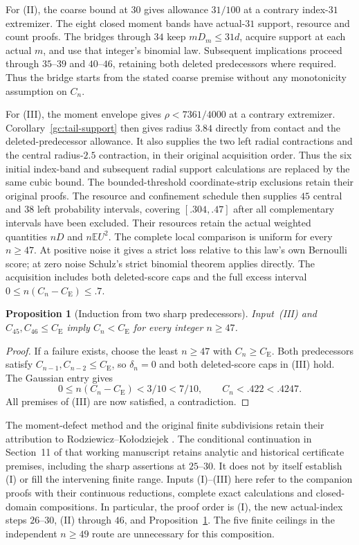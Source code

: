 \documentclass[aop,preprint]{imsart}
\newtheorem{proposition}[theorem]{Proposition}
\theoremstyle{definition}
\newcommand{\CE}{C_{\mathrm E}}
\newcommand{\E}{\mathbb E}
\numberwithin{equation}{section}
\begin{document}
For (II), the coarse bound at $30$ gives allowance $31/100$ at
a contrary index-$31$ extremizer. The eight closed moment bands have
actual-$31$ support, resource and count proofs. The bridges through
$34$ keep $mD_m\le31d$, acquire support at each actual $m$, and use
that integer's binomial law. Subsequent implications proceed through
$35$--$39$ and $40$--$46$, retaining both deleted predecessors where
required. Thus the bridge starts from the stated coarse premise
without any monotonicity assumption on $C_n$.


For (III), the moment envelope gives $\rho<7361/4000$ at a contrary
extremizer. Corollary~\ref{gc:tail-support} then gives radius $3.84$
directly from contact and the deleted-predecessor allowance.
It also supplies the two left radial contractions and the central
radius-$2.5$ contraction, in their original acquisition order.
Thus the six initial index-band and subsequent radial support
calculations are replaced by the same cubic bound. The bounded-threshold
coordinate-strip exclusions retain their original proofs.
The resource and confinement schedule then supplies $45$ central
and $38$ left probability intervals, covering $[.304,.47]$ after
all complementary intervals have been excluded. Their resources
retain the actual weighted quantities $nD$ and $n\E U^2$.
The complete local comparison is uniform for every $n\ge47$.
At positive noise it gives a strict loss relative to this law's
own Bernoulli score; at zero noise Schulz's strict binomial theorem
applies directly. The acquisition includes both deleted-score caps
and the full excess interval $0\le n(C_n-\CE)\le.7$.

\begin{proposition}[Induction from two sharp predecessors]\label{gi:tail}
Input~(III) and $C_{45},C_{46}\le\CE$ imply
$C_n<\CE$ for every integer $n\ge47$.
\end{proposition}
\begin{proof}
If a failure exists, choose the least $n\ge47$ with $C_n\ge\CE$.
Both predecessors satisfy $C_{n-1},C_{n-2}\le\CE$, so $\delta_n=0$
and both deleted-score caps in (III) hold. The Gaussian entry gives
\[
 0\le n(C_n-\CE)<3/10<7/10,\qquad
 C_n<.422<.4247.
\]
All premises of (III) are now satisfied, a contradiction.
\end{proof}

The moment-defect method and the original finite subdivisions retain
their attribution to Rodziewicz--Ko\l{}odziejek \cite{RK2026}.
The conditional continuation in Section~11 of that working manuscript
retains analytic and historical certificate premises, including the
sharp assertions at $25$--$30$. It does not by itself establish (I) or
fill the intervening finite range. Inputs (I)--(III) here refer to the
companion proofs with their continuous reductions, complete exact
calculations and closed-domain compositions. In particular, the proof
order is (I), the new actual-index steps $26$--$30$, (II) through
$46$, and Proposition~\ref{gi:tail}. The five finite ceilings in
the independent $n\ge49$ route are unnecessary for this composition.
\end{document}
